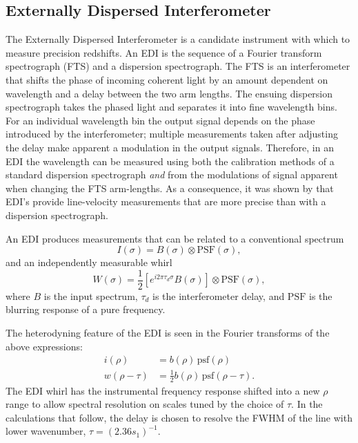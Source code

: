 \documentclass[preprint2, 10pt]{aastex}
\begin{document}
\subsection{Externally Dispersed Interferometer}
The Externally Dispersed Interferometer \citep[EDI;][]{2003PASP..115..255E} is a candidate instrument with which to measure precision redshifts.
An EDI is the sequence of a Fourier transform spectrograph (FTS) and a dispersion spectrograph.  The FTS is an interferometer that shifts
the phase of incoming coherent light
by an amount dependent on wavelength and a  delay between the two arm lengths.
The ensuing dispersion spectrograph takes the phased light and separates it into fine wavelength bins.
For an individual wavelength bin the output signal depends on the phase introduced by the interferometer; multiple
measurements taken after adjusting the delay  make apparent a modulation in the output signals.
Therefore, in an EDI the wavelength can be measured using both the calibration methods of a standard dispersion
spectrograph {\it and} from the modulations of signal apparent when changing the FTS arm-lengths.   As a consequence,
it was shown by
\citet{2003PASP..115..255E} that EDI's provide line-velocity measurements that are more precise than with a dispersion spectrograph.

An EDI produces measurements that can be related
to a conventional spectrum
\begin{equation}
I(\sigma) = B(\sigma) \otimes \mbox{PSF}(\sigma),
\end{equation}
and an independently measurable whirl
\begin{equation}
W(\sigma) = \frac{1}{2}\left[e^{i2\pi\tau_d\sigma}B(\sigma)\right] \otimes \mbox{PSF}(\sigma),
\end{equation}
where $B$ is the input spectrum, $\tau_d$ is the interferometer delay, and $\mbox{PSF}$  is the blurring
response of a pure frequency.

The heterodyning feature of the EDI is seen in the Fourier transforms of the above expressions:
\begin{align}
i(\rho) & =b(\rho) \, \mbox{psf}(\rho)\\
w(\rho -\tau) & =\frac{1}{2} b(\rho) \, \mbox{psf}(\rho-\tau).
\end{align}
The EDI whirl has the instrumental frequency response shifted into a new $\rho$ range to allow
spectral
resolution on scales tuned by the choice of $\tau$.  In the calculations that follow, the delay is chosen to resolve
the FWHM of the line with lower wavenumber, $\tau = (2.36s_1)^{-1}$.
\end{document}
